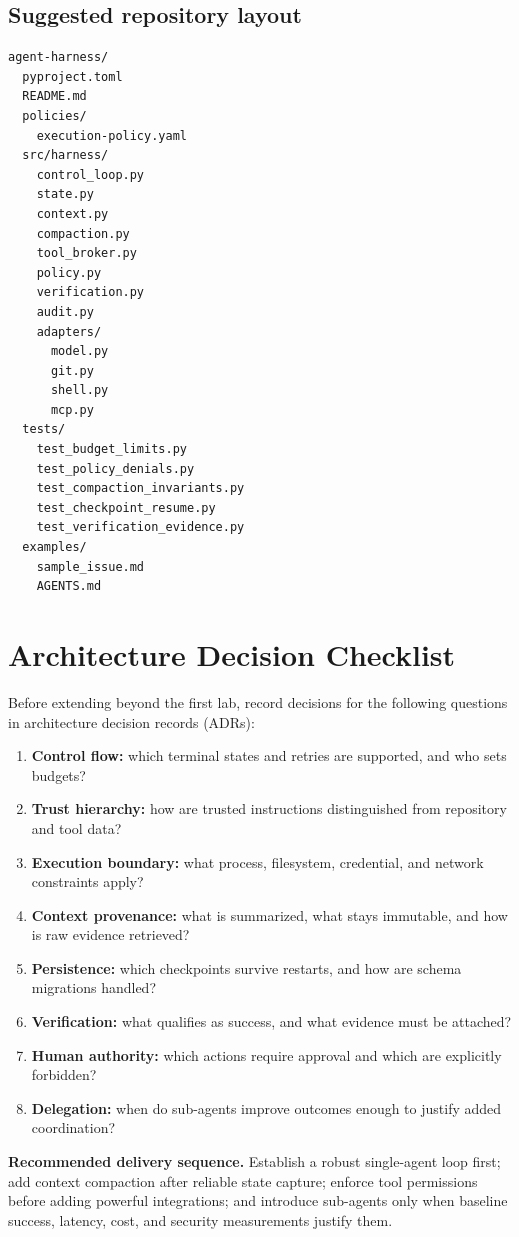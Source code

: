 \documentclass[10pt,letterpaper]{article}
\newcommand{\term}[1]{\textbf{\color{DeepBlue}#1}}
\begin{document}
\subsection{Suggested repository layout}
\begin{lstlisting}[style=textstyle,caption={Minimal harness project structure.}]
agent-harness/
  pyproject.toml
  README.md
  policies/
    execution-policy.yaml
  src/harness/
    control_loop.py
    state.py
    context.py
    compaction.py
    tool_broker.py
    policy.py
    verification.py
    audit.py
    adapters/
      model.py
      git.py
      shell.py
      mcp.py
  tests/
    test_budget_limits.py
    test_policy_denials.py
    test_compaction_invariants.py
    test_checkpoint_resume.py
    test_verification_evidence.py
  examples/
    sample_issue.md
    AGENTS.md
\end{lstlisting}

\section{Architecture Decision Checklist}\label{sec:adr}
Before extending beyond the first lab, record decisions for the following questions in architecture decision records (ADRs):
\begin{enumerate}
  \item \term{Control flow:} which terminal states and retries are supported, and who sets budgets?
  \item \term{Trust hierarchy:} how are trusted instructions distinguished from repository and tool data?
  \item \term{Execution boundary:} what process, filesystem, credential, and network constraints apply?
  \item \term{Context provenance:} what is summarized, what stays immutable, and how is raw evidence retrieved?
  \item \term{Persistence:} which checkpoints survive restarts, and how are schema migrations handled?
  \item \term{Verification:} what qualifies as success, and what evidence must be attached?
  \item \term{Human authority:} which actions require approval and which are explicitly forbidden?
  \item \term{Delegation:} when do sub-agents improve outcomes enough to justify added coordination?
\end{enumerate}

\begin{principlebox}
\textbf{Recommended delivery sequence.} Establish a robust single-agent loop first; add context compaction after reliable state capture; enforce tool permissions before adding powerful integrations; and introduce sub-agents only when baseline success, latency, cost, and security measurements justify them.
\end{principlebox}
\end{document}
